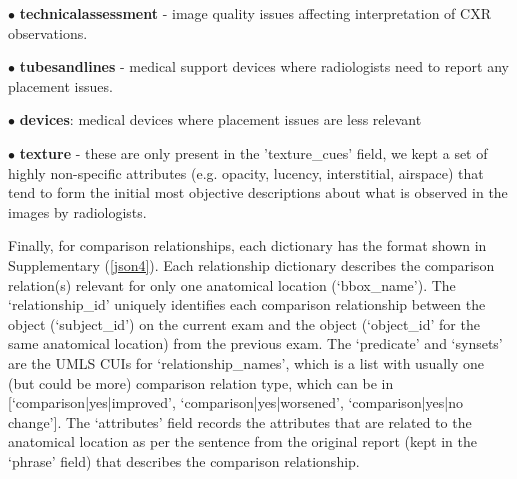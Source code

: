 $\bullet$ \textbf{technicalassessment} - image quality issues affecting interpretation of CXR observations.
\vspace{-2pt}

$\bullet$ \textbf{tubesandlines} - medical support devices where radiologists need to report any placement issues.
\vspace{-2pt}

$\bullet$ \textbf{devices}: medical devices where placement issues are less relevant
\vspace{-2pt}

$\bullet$ \textbf{texture} - these are only present in the 'texture\_cues' field, we kept a set of highly non-specific attributes (e.g. opacity, lucency, interstitial, airspace) that tend to form the initial most objective descriptions about what is observed in the images by radiologists. 

Finally, for comparison relationships, each dictionary has the format shown in Supplementary (\ref{json4}). Each relationship dictionary describes the comparison relation(s) relevant for only one anatomical location (`bbox\_name'). The `relationship\_id' uniquely identifies each comparison relationship between the object (`subject\_id') on the current exam and the object (`object\_id' for the same anatomical location) from the previous exam. The `predicate' and `synsets' are the UMLS CUIs for `relationship\_names', which is a list with usually one (but could be more) comparison relation type, which can be in [`comparison|yes|improved', `comparison|yes|worsened', `comparison|yes|no change']. The `attributes' field records the attributes that are related to the anatomical location as per the sentence from the original report (kept in the `phrase' field) that describes the comparison relationship.


